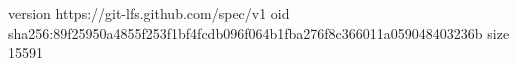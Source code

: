 version https://git-lfs.github.com/spec/v1
oid sha256:89f25950a4855f253f1bf4fcdb096f064b1fba276f8c366011a059048403236b
size 15591

